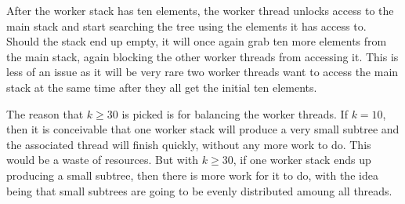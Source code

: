 \documentclass[a4paper]{article}
\begin{document}
After the worker stack has ten elements, the worker thread unlocks access to the main stack and start searching the tree using the elements it has access to. Should the stack end up empty, it will once again grab ten more elements from the main stack, again blocking the other worker threads from accessing it. This is less of an issue as it will be very rare two worker threads want to access the main stack at the same time after they all get the initial ten elements.

The reason that $k\geq 30$ is picked is for balancing the worker threads. If $k=10$, then it is conceivable that one worker stack will produce a very small subtree and the associated thread will finish quickly, without any more work to do. This would be a waste of resources. But with $k\geq 30$, if one worker stack ends up producing a small subtree, then there is more work for it to do, with the idea being that small subtrees are going to be evenly distributed amoung all threads.
\end{document}
